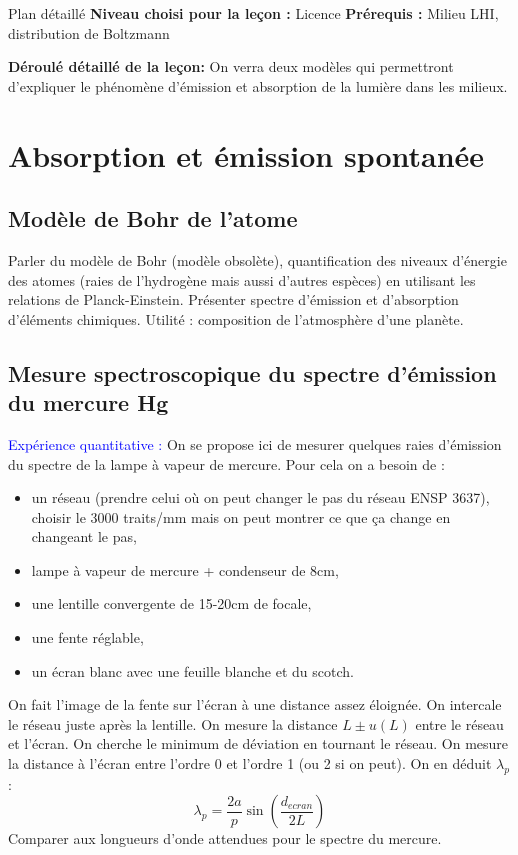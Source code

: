 \begin{reportBlock}{Plan détaillé}
  \textbf{Niveau choisi pour la leçon :} Licence
  \newline
  \textbf{Prérequis : }Milieu LHI, distribution de Boltzmann
  \newline
  
  \textbf{Déroulé détaillé de la leçon: }   \newline
On verra deux modèles qui permettront d'expliquer le phénomène d'émission et absorption de la lumière dans les milieux.
  \section{Absorption et émission spontanée}

  \subsection{Modèle de Bohr de l'atome}
  Parler du modèle de Bohr (modèle obsolète), quantification des niveaux d'énergie des atomes (raies de l'hydrogène mais aussi d'autres espèces) en utilisant les relations de Planck-Einstein. Présenter spectre d'émission et d'absorption d'éléments chimiques. Utilité : composition de l'atmosphère d'une planète.
  \subsection{Mesure spectroscopique du spectre d'émission du mercure Hg}
  \textcolor{blue}{Expérience quantitative :} On se propose ici de mesurer quelques raies d'émission du spectre de la lampe à vapeur de mercure. Pour cela on a besoin de :
  \begin{itemize}
      \item un réseau (prendre celui où on peut changer le pas du réseau ENSP 3637), choisir le 3000 traits/mm mais on peut montrer ce que ça change en changeant le pas,
      \item lampe à vapeur de mercure + condenseur de 8cm,
      \item une lentille convergente de 15-20cm de focale,
      \item une fente réglable,
      \item un écran blanc avec une feuille blanche et du scotch.
  \end{itemize}
On fait l'image de la fente sur l'écran à une distance assez éloignée. On intercale le réseau juste après la lentille. On mesure la distance $L\pm u(L)$ entre le réseau et l'écran. On cherche le minimum de déviation en tournant le réseau. On mesure la distance à l'écran entre l'ordre 0 et l'ordre 1 (ou 2 si on peut). On en déduit $\lambda_p$ :
\begin{equation}
    \lambda_p = \frac{2a}{p}\sin\left(\frac{d_{ecran}}{2L}\right)
\end{equation}
Comparer aux longueurs d'onde attendues pour le spectre du mercure.

\end{reportBlock}
